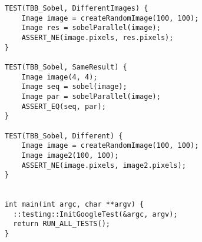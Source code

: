 \documentclass{report}
\begin{document}
\begin{lstlisting}
TEST(TBB_Sobel, DifferentImages) {
    Image image = createRandomImage(100, 100);
    Image res = sobelParallel(image);
    ASSERT_NE(image.pixels, res.pixels);
}

TEST(TBB_Sobel, SameResult) {
    Image image(4, 4);
    Image seq = sobel(image);
    Image par = sobelParallel(image);
    ASSERT_EQ(seq, par);
}

TEST(TBB_Sobel, Different) {
    Image image = createRandomImage(100, 100);
    Image image2(100, 100);
    ASSERT_NE(image.pixels, image2.pixels);
}


int main(int argc, char **argv) {
  ::testing::InitGoogleTest(&argc, argv);
  return RUN_ALL_TESTS();
}
\end{lstlisting}
\end{document}
